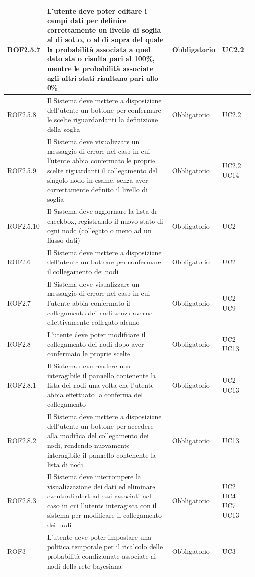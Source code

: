 \begin{center}
\begin{longtable}[c]{|m{}|m{}|m{}|m{}|}
\hline
\rowcolor{grigio}ROF2.5.7 & L'utente deve poter editare i campi dati per definire correttamente un livello di soglia al di sotto, o al di sopra del quale la probabilità associata a quel dato stato risulta pari al 100\%, mentre le probabilità associate agli altri stati risultano pari allo 0\% & Obbligatorio & UC2.2\\
\hline
ROF2.5.8 & Il Sistema deve mettere a disposizione dell'utente un bottone per confermare le scelte riguardardanti la definizione della soglia & Obbligatorio & UC2.2\\
\hline
\rowcolor{grigio}ROF2.5.9 & Il Sistema deve visualizzare un messaggio di errore nel caso in cui l'utente abbia confermato le proprie scelte riguardanti il collegamento del singolo nodo in esame, senza aver correttamente definito il livello di soglia & Obbligatorio & UC2.2 UC14\\
\hline
ROF2.5.10 & Il Sistema deve aggiornare la lista di checkbox, registrando il nuovo stato di ogni nodo (collegato o meno ad un flusso dati) & Obbligatorio & UC2\\
\hline
\rowcolor{grigio}ROF2.6 & Il Sistema deve mettere a disposizione dell'utente un bottone per confermare il collegamento dei nodi & Obbligatorio & UC2\\
\hline
ROF2.7 & Il Sistema deve visualizzare un messaggio di errore nel caso in cui l'utente abbia confermato il collegamento dei nodi senza averne effettivamente collegato alcuno & Obbligatorio & UC2 UC9\\
\hline
\rowcolor{grigio}ROF2.8 & L'utente deve poter modificare il collegamento dei nodi dopo aver confermato le proprie scelte & Obbligatorio & UC2 UC13\\
\hline
ROF2.8.1 & Il Sistema deve rendere non interagibile il pannello contenente la lista dei nodi una volta che l'utente abbia effettuato la conferma del collegamento & Obbligatorio & UC2 UC13\\
\hline
\rowcolor{grigio}ROF2.8.2 & Il Sistema deve mettere a disposizione dell'utente un bottone per accedere alla modifica del collegamento dei nodi, rendendo nuovamente interagibile il pannello contenente la lista di nodi & Obbligatorio & UC13\\
\hline
ROF2.8.3 & Il Sistema deve interrompere la visualizzazione dei dati ed eliminare eventuali alert ad essi associati nel caso in cui l'utente interagisca con il sistema per modificare il collegamento dei nodi & Obbligatorio & UC2 UC4 UC7 UC13\\
\hline
\rowcolor{grigio}ROF3 & L'utente deve poter impostare una politica temporale per il ricalcolo delle probabilità condizionate associate ai nodi della rete bayesiana & Obbligatorio & UC3\\

\end{longtable}
\end{center}
